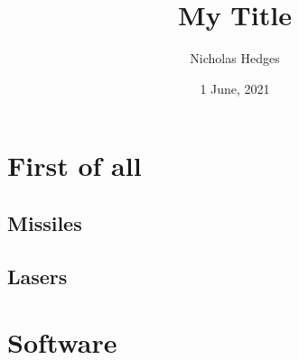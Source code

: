 \documentclass{apa-article}
\title{My Title}
\author{Nicholas Hedges}
\date{1 June, 2021}
\begin{document}
\maketitle

\section{First of all}
\subsection{Missiles}
\subsection{Lasers}
\section{Software}
\end{document}

